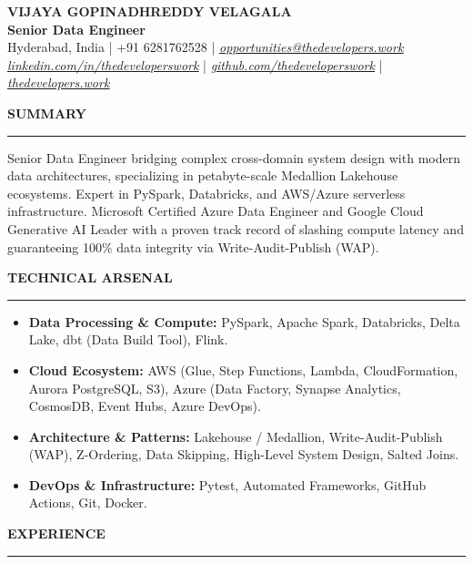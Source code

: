 \documentclass[10pt, letterpaper]{article}
\newcommand{\resumesection}[1]{
  \vspace{8pt}
  \noindent \textbf{\large \uppercase{#1}} \\
  \vspace{-8pt}
  \hrule
  \vspace{6pt}
}
\begin{document}
\pagestyle{empty}

\begin{center}
    {\LARGE \textbf{VIJAYA GOPINADHREDDY VELAGALA}} \\
    \vspace{2pt}
    \textsf{\textbf{Senior Data Engineer}} \\
    \vspace{4pt}
    Hyderabad, India | +91 6281762528 | \href{mailto:opportunities@thedevelopers.work}{\textit{\underline{opportunities@thedevelopers.work}}} \\
    \href{https://linkedin.com/in/thedeveloperswork}{\textit{\underline{linkedin.com/in/thedeveloperswork}}} | \href{https://github.com/thedeveloperswork}{\textit{\underline{github.com/thedeveloperswork}}} | \href{https://thedevelopers.work}{\textit{\underline{thedevelopers.work}}}
\end{center}

\resumesection{Summary}
\noindent Senior Data Engineer bridging complex cross-domain system design with modern data architectures, specializing in petabyte-scale Medallion Lakehouse ecosystems. Expert in PySpark, Databricks, and AWS/Azure serverless infrastructure. Microsoft Certified Azure Data Engineer and Google Cloud Generative AI Leader with a proven track record of slashing compute latency and guaranteeing 100\% data integrity via Write-Audit-Publish (WAP).

\resumesection{Technical Arsenal}
\begin{itemize}
    \setlength{\itemsep}{1pt}
    \setlength{\leftmargin}{0.25in}
    \item \textbf{Data Processing \& Compute:} PySpark, Apache Spark, Databricks, Delta Lake, dbt (Data Build Tool), Flink.
    \item \textbf{Cloud Ecosystem:} AWS (Glue, Step Functions, Lambda, CloudFormation, Aurora PostgreSQL, S3), Azure (Data Factory, Synapse Analytics, CosmosDB, Event Hubs, Azure DevOps).
    \item \textbf{Architecture \& Patterns:} Lakehouse / Medallion, Write-Audit-Publish (WAP), Z-Ordering, Data Skipping, High-Level System Design, Salted Joins.
    \item \textbf{DevOps \& Infrastructure:} Pytest, Automated Frameworks, GitHub Actions, Git, Docker.
\end{itemize}

\resumesection{Experience}
\end{document}
